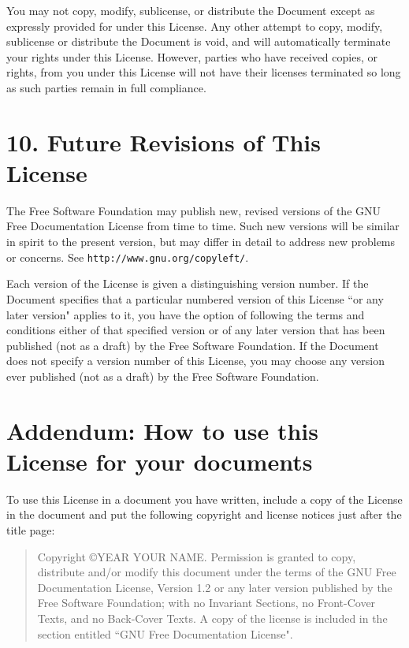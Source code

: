 \documentclass[12pt]{book}
\newcounter{exc}
\numberwithin{exc}{section}
\numberwithin{figure}{section}
\numberwithin{equation}{theorem}
\begin{document}
You may not copy, modify, sublicense, or distribute the Document except
as expressly provided for under this License.  Any other attempt to
copy, modify, sublicense or distribute the Document is void, and will
automatically terminate your rights under this License.  However,
parties who have received copies, or rights, from you under this
License will not have their licenses terminated so long as such
parties remain in full compliance.

\section{10. Future Revisions of This License}


The Free Software Foundation may publish new, revised versions
of the GNU Free Documentation License from time to time.  Such new
versions will be similar in spirit to the present version, but may
differ in detail to address new problems or concerns.  See
\texttt{http://www.gnu.org/copyleft/}.

Each version of the License is given a distinguishing version number.
If the Document specifies that a particular numbered version of this
License ``or any later version" applies to it, you have the option of
following the terms and conditions either of that specified version or
of any later version that has been published (not as a draft) by the
Free Software Foundation.  If the Document does not specify a version
number of this License, you may choose any version ever published (not
as a draft) by the Free Software Foundation.

\section{Addendum: How to use this License for your documents}

To use this License in a document you have written, include a copy of
the License in the document and put the following copyright and
license notices just after the title page:

\bigskip
\begin{quote}
    Copyright \copyright  YEAR  YOUR NAME.
    Permission is granted to copy, distribute and/or modify this document
    under the terms of the GNU Free Documentation License, Version 1.2
    or any later version published by the Free Software Foundation;
    with no Invariant Sections, no Front-Cover Texts, and no Back-Cover Texts.
    A copy of the license is included in the section entitled ``GNU
    Free Documentation License".
\end{quote}
\bigskip
    
\end{document}
